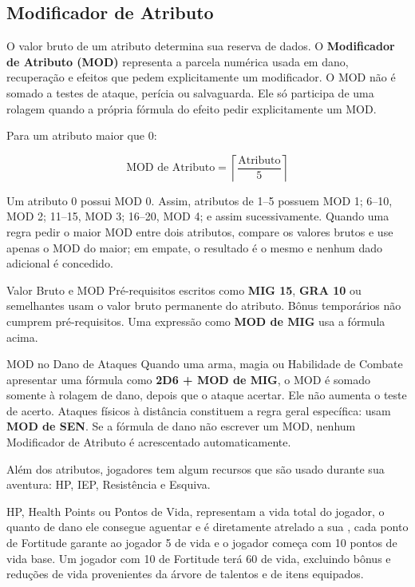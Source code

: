 \subsection*{Modificador de Atributo}

O valor bruto de um atributo determina sua reserva de dados. O \textbf{Modificador de Atributo (MOD)} representa a parcela numérica usada em dano, recuperação e efeitos que pedem explicitamente um modificador. O MOD não é somado a testes de ataque, perícia ou salvaguarda. Ele só participa de uma rolagem quando a própria fórmula do efeito pedir explicitamente um MOD.

Para um atributo maior que 0:

\[\text{MOD de Atributo}=\left\lceil\frac{\text{Atributo}}{5}\right\rceil\]

Um atributo 0 possui MOD 0. Assim, atributos de 1--5 possuem MOD 1; 6--10, MOD 2; 11--15, MOD 3; 16--20, MOD 4; e assim sucessivamente. Quando uma regra pedir o maior MOD entre dois atributos, compare os valores brutos e use apenas o MOD do maior; em empate, o resultado é o mesmo e nenhum dado adicional é concedido.

\begin{rpgboxtips}{Valor Bruto e MOD}
Pré-requisitos escritos como \textbf{MIG 15}, \textbf{GRA 10} ou semelhantes usam o valor bruto permanente do atributo. Bônus temporários não cumprem pré-requisitos. Uma expressão como \textbf{MOD de MIG} usa a fórmula acima.
\end{rpgboxtips}

\begin{rpgboxtips}{MOD no Dano de Ataques}
Quando uma arma, magia ou Habilidade de Combate apresentar uma fórmula como \textbf{2D6 + MOD de MIG}, o MOD é somado somente à rolagem de dano, depois que o ataque acertar. Ele não aumenta o teste de acerto. Ataques físicos à distância constituem a regra geral específica: usam \textbf{MOD de SEN}. Se a fórmula de dano não escrever um MOD, nenhum Modificador de Atributo é acrescentado automaticamente.
\end{rpgboxtips}

Além dos atributos, jogadores tem algum recursos que são usado durante sua aventura: HP, IEP, Resistência e Esquiva.

HP, Health Points ou Pontos de Vida, representam a vida total do jogador, o quanto de dano ele consegue aguentar e 
é diretamente atrelado a sua , cada ponto de Fortitude garante ao jogador 5 de vida e o jogador começa com 10 pontos de vida base. 
Um jogador com 10 de Fortitude terá 60 de vida, excluindo bônus e reduções de vida provenientes da árvore de talentos 
e de itens equipados.

